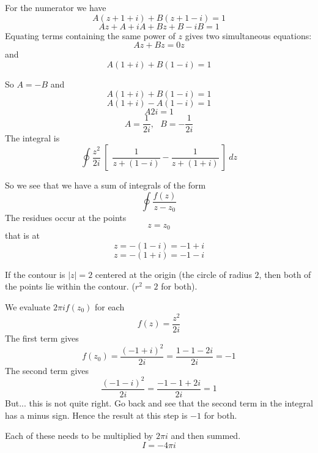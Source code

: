 \documentclass[11pt, oneside]{article}
\begin{document}
For the numerator we have
\[ A(z + 1 + i) + B(z + 1 - i) = 1 \]
\[ Az + A + iA + Bz + B - iB = 1 \]
Equating terms containing the same power of $z$ gives two simultaneous equations:
\[ Az + Bz = 0z \]
and
\[ A(1 + i) + B(1 - i) = 1 \]

So $A = -B$ and
\[ A(1 + i) + B(1 - i) = 1 \]
\[ A (1 + i) - A(1 - i) = 1 \]
\[ A 2i = 1 \]
\[ A = \frac{1}{2i}, \ \ \ B = -\frac{1}{2i} \]
The integral is
\[ \oint \frac{z^2}{2i} \ [ \ \ \frac{1}{z + (1 - i)} -  \frac{1}{z + (1 + i)} \ ] \ dz \]

So we see that we have a sum of integrals of the form
\[ \oint \frac{f(z)}{z - z_0} \]
The residues occur at the points
\[ z = z_0 \]
that is at 
\[ z = - (1 - i) = -1 + i \]
\[ z = - (1 + i) = -1 - i \]

If the contour is $|z| = 2$ centered at the origin (the circle of radius $2$, then both of the points lie within the contour.  ($ r^2 = 2$ for both).

We evaluate $2 \pi i f(z_0)$ for each
\[ f(z) = \frac{z^2}{2i} \]
The first term gives
\[ f(z_0) = \frac{(-1 + i)^2}{2i} =  \frac{1 - 1 - 2i}{2i} = -1 \]
The second term gives 
\[ \frac{(-1 -i)^2}{2i} = \frac{-1 - 1 + 2i}{2i} = 1 \]
But...  this is not quite right.  Go back and see that the second term in the integral has a minus sign.  Hence the result at this step is $-1$ for both.

Each of these needs to be multiplied by $2 \pi i$ and then summed.
\[ I = -4 \pi i \]
\end{document}
